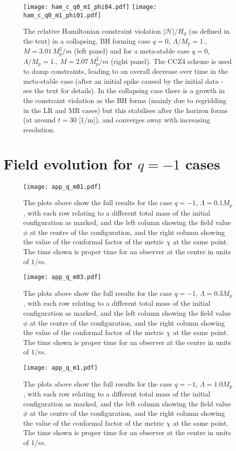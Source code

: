 \documentclass[11pt,a4paper]{article}
\begin{document}
\begin{figure}[]\centering
\texttt{[image: ham\_c\_q0\_m1\_phi04.pdf]}
\texttt{[image: ham\_c\_q0\_m1\_phi01.pdf]}
\caption{The relative Hamiltonian constraint violation $|\mathcal{H}|/ H_0$ (as defined in the text) in a collapsing, BH forming case $q=0$, $\Lambda/M_p=1.$, $M = 3.01 \, M_p^2/m$ (left panel) and for a meta-stable case $q=0$, $\Lambda/M_p=1.$, $M = 2.07 \, M_p^2/m$ (right panel). The CCZ4 scheme is used to damp constraints, leading to an overall decrease over time in the meta-stable case (after an initial spike caused by the initial data - see the text for details). In the collapsing case there is a growth in the constraint violation as the BH forms (mainly due to regridding in the LR and MR cases) but this stabilises after the horizon forms (at around $t=30$ [1/m]), and converges away with increasing resolution.}
\label{fig-ham}
\end{figure}

\clearpage

\section{Field evolution for $q = -1$ cases}
\label{app:qminus1}
\begin{figure}[h!]\centering
\texttt{[image: app\_q\_m01.pdf]}
\caption{The plots above show the full results for the case $q=-1$, $\Lambda=0.1 M_p$, with each row relating to a different total mass of the initial configuration as marked, and the left column showing the field value $\phi$ at the centre of the configuration, and the right column showing the value of the conformal factor of the metric $\chi$ at the same point.  The time shown is proper time for an observer at the centre in units of $1/m$.}
\end{figure}
\pagebreak
\begin{figure}[h!]\centering
\texttt{[image: app\_q\_m03.pdf]}
\caption{The plots above show the full results for the case $q=-1$, $\Lambda=0.3 M_p$, with each row relating to a different total mass of the initial configuration as marked, and the left column showing the field value $\phi$ at the centre of the configuration, and the right column showing the value of the conformal factor of the metric $\chi$ at the same point. The time shown is proper time for an observer at the centre in units of $1/m$.}
\end{figure}
\pagebreak
\begin{figure}[h!]\centering
\texttt{[image: app\_q\_m1.pdf]}
\caption{The plots above show the full results for the case $q=-1$, $\Lambda=1.0 M_p$, with each row relating to a different total mass of the initial configuration as marked, and the left column showing the field value $\phi$ at the centre of the configuration, and the right column showing the value of the conformal factor of the metric $\chi$ at the same point. The time shown is proper time for an observer at the centre in units of $1/m$.}
\end{figure}
\end{document}
